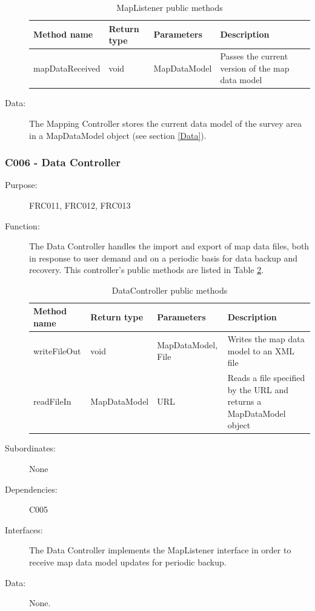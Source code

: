 \documentclass[12pt]{article}
\begin{document}
\begin{description}
\begin{table}
\begin{tabular}{ | p{} | p{} |p{}|p{}|}
\hline
\textbf{Method name} & \textbf{Return type} & \textbf{Parameters} & \textbf{Description} \\
\hline
mapDataReceived & void & MapDataModel & Passes the current version of the map data model \\
\hline
\end{tabular}
\caption{MapListener public methods}
\label{table:maplistener}
\end{table}

\item[{Data: }] The Mapping Controller stores the current data model of the survey area in a MapDataModel object (see section \ref{Data}).

\end{description}
\FloatBarrier
\subsubsection{C006 - Data Controller}
\begin{description}
\item [{Purpose:}] FRC011, FRC012, FRC013
\item [{Function: }] The Data Controller handles the import and export of map data files, both in response to user demand and on a periodic basis for data backup and recovery. This controller's public methods are listed in Table \ref{table:datacontroller}.

\begin{table}[h!]
\begin{tabular}{ | p{} | p{} |p{}|p{}|}
\hline
\textbf{Method name} & \textbf{Return type} & \textbf{Parameters} & \textbf{Description} \\
\hline
writeFileOut & void & MapDataModel, File & Writes the map data model to an XML file \\
\hline
readFileIn & MapDataModel & URL & Reads a file specified by the URL and returns a MapDataModel object \\
\hline
\end{tabular}
\caption{DataController public methods}
\label{table:datacontroller}
\end{table}

\item[{Subordinates: }] None
\item[{Dependencies: }] C005

\item[{Interfaces: }] The Data Controller implements the MapListener interface in order to receive map data model updates for periodic backup.

\item[{Data: }] None.

\end{description}
\end{document}
